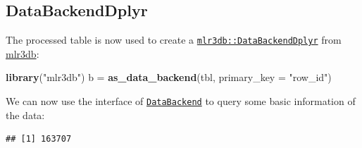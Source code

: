 \documentclass[]{scrbook}
\newenvironment{Shaded}{\begin{snugshade}}{\end{snugshade}}
\newcommand{\DataTypeTok}[1]{\textcolor[rgb]{0.13,0.29,0.53}{#1}}
\newcommand{\KeywordTok}[1]{\textcolor[rgb]{0.13,0.29,0.53}{\textbf{#1}}}
\newcommand{\NormalTok}[1]{#1}
\newcommand{\OperatorTok}[1]{\textcolor[rgb]{0.81,0.36,0.00}{\textbf{#1}}}
\newcommand{\OtherTok}[1]{\textcolor[rgb]{0.56,0.35,0.01}{#1}}
\newcommand{\StringTok}[1]{\textcolor[rgb]{0.31,0.60,0.02}{#1}}
\renewenvironment{Shaded} {\begin{snugshade}\small} {\end{snugshade}}
\begin{document}
\begin{Shaded}
\end{Shaded}

\hypertarget{databackenddplyr}{%
\subsection{DataBackendDplyr}\label{databackenddplyr}}

The processed table is now used to create a \href{https://mlr3db.mlr-org.com/reference/DataBackendDplyr.html}{\texttt{mlr3db::DataBackendDplyr}} from \href{https://mlr3db.mlr-org.com}{mlr3db}:

\begin{Shaded}
\begin{Highlighting}[]
\KeywordTok{library}\NormalTok{(}\StringTok{"mlr3db"}\NormalTok{)}
\NormalTok{b =}\StringTok{ }\KeywordTok{as_data_backend}\NormalTok{(tbl, }\DataTypeTok{primary_key =} \StringTok{"row_id"}\NormalTok{)}
\end{Highlighting}
\end{Shaded}

We can now use the interface of \href{https://mlr3.mlr-org.com/reference/DataBackend.html}{\texttt{DataBackend}} to query some basic information of the data:

\begin{Shaded}
\end{Shaded}

\begin{verbatim}
## [1] 163707
\end{verbatim}

\begin{Shaded}
\end{Shaded}
\end{document}
